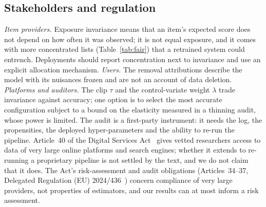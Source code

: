 \documentclass[preprint,review,12pt,authoryear]{elsarticle}
\theoremstyle{definition}
\begin{document}
\subsection{Stakeholders and regulation}\label{sec:stake}
\emph{Item providers.} Exposure invariance means that an item's expected score does not
depend on how often it was observed; it is not equal exposure, and it comes with more
concentrated lists (Table~\ref{tab:fair}) that a retrained system could entrench.
Deployments should report concentration next to invariance and use an explicit allocation
mechanism. \emph{Users.} The removal attributions describe the model with its nuisances
frozen and are not an account of data deletion. \emph{Platforms and auditors.} The clip
$\tau$ and the control-variate weight $\lambda$ trade invariance against accuracy; one
option is to select the most accurate configuration subject to a bound on the elasticity
measured in a thinning audit, whose power is limited. The audit is a first-party
instrument: it needs the log, the propensities, the deployed hyper-parameters and the
ability to re-run the pipeline. Article~40 of the Digital Services
Act~\citep{dsa2022} gives vetted researchers access to data of very large online platforms
and search engines; whether it extends to re-running a proprietary pipeline is not settled
by the text, and we do not claim that it does. The Act's risk-assessment and audit
obligations (Articles~34--37, Delegated Regulation (EU) 2024/436~\citep{eu2024audit})
concern compliance of very large providers, not properties of estimators, and our results
can at most inform a risk assessment.





\end{document}
